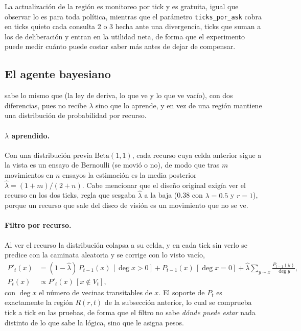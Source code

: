 La actualización de la región es monitoreo por tick y es gratuita, igual que observar lo es para toda política, mientras que el parámetro \texttt{ticks\_por\_ask} cobra en ticks quieto cada consulta 2 o 3 hecha ante una divergencia, ticks que suman a los de deliberación y entran en la utilidad neta, de forma que el experimento puede medir cuánto puede costar saber más antes de dejar de compensar.

\subsection{El agente bayesiano}\label{sec:modelo-bayes}

\BY{} sabe lo mismo que \KB{} (la ley de deriva, lo que ve y lo que ve vacío), con dos diferencias, pues no recibe $\lambda$ sino que lo aprende, y en vez de una región mantiene una distribución de probabilidad por recurso.

\paragraph{$\lambda$ aprendido.} Con una distribución previa $\mathrm{Beta}(1,1)$, cada recurso cuya celda anterior sigue a la vista es un ensayo de Bernoulli (se movió o no), de modo que tras $m$ movimientos en $n$ ensayos la estimación es la media posterior $\hat\lambda = (1+m)/(2+n)$. Cabe mencionar que el diseño original exigía ver el recurso en los dos ticks, regla que sesgaba $\hat\lambda$ a la baja (0.38 con $\lambda=0.5$ y $r=1$), porque un recurso que sale del disco de visión es un movimiento que no se ve.

\paragraph{Filtro por recurso.} Al ver el recurso la distribución colapsa a su celda, y en cada tick sin verlo se predice con la caminata aleatoria y se corrige con lo visto vacío,
\begin{align}
  P'_t(x) &= (1-\hat\lambda)\,P_{t-1}(x)\,[\deg x > 0] + P_{t-1}(x)\,[\deg x = 0] + \hat\lambda \sum_{y \sim x} \frac{P_{t-1}(y)}{\deg y},\\
  P_t(x) &\propto P'_t(x)\,[x \notin V_t],
\end{align}
con $\deg x$ el número de vecinas transitables de $x$. El soporte de $P_t$ es exactamente la región $R(r,t)$ de la subsección anterior, lo cual se comprueba tick a tick en las pruebas, de forma que el filtro no sabe \emph{dónde puede estar} nada distinto de lo que sabe la lógica, sino que le asigna pesos.

